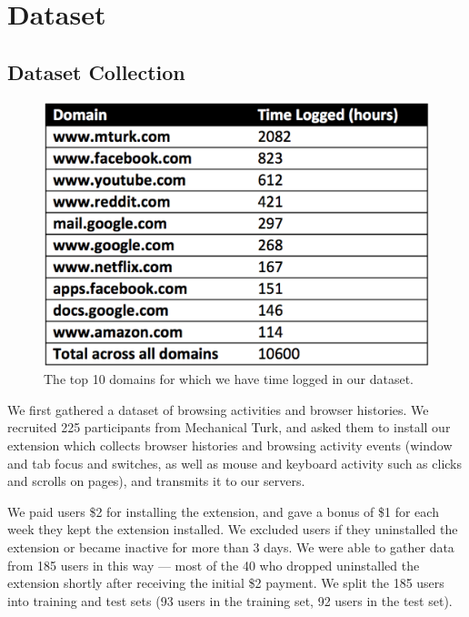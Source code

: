 \documentclass{sigchi}
\begin{document}
\section{Dataset}

\subsection{Dataset Collection}

\begin{figure}
    \centering
    \includegraphics[width=0.9\columnwidth]{top-domains}
    \caption{The top 10 domains for which we have time logged in our dataset.}
    \label{fig:top-domains}
\end{figure}


We first gathered a dataset of browsing activities and browser histories. We recruited 225 participants from Mechanical Turk, and asked them to install our extension which collects browser histories and browsing activity events (window and tab focus and switches, as well as mouse and keyboard activity such as clicks and scrolls on pages), and transmits it to our servers.

We paid users \$2 for installing the extension, and gave a bonus of \$1 for each week they kept the extension installed. We excluded users if they uninstalled the extension or became inactive for more than 3 days. We were able to gather data from 185 users in this way --- most of the 40 who dropped uninstalled the extension shortly after receiving the initial \$2 payment. We split the 185 users into training and test sets (93 users in the training set, 92 users in the test set).

\end{document}
